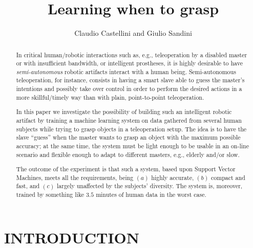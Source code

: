\documentclass{article}
\title{\LARGE \bf Learning when to grasp}
\author{Claudio Castellini and Giulio Sandini}
\begin{document}
\maketitle

\begin{abstract}

In critical human/robotic interactions such as, e.g., teleoperation by
a disabled master or with insufficient bandwidth, or intelligent
prostheses, it is highly desirable to have \emph{semi-autonomous}
robotic artifacts interact with a human being. Semi-autonomous
teleoperation, for instance, consists in having a smart slave able to
guess the master's intentions and possibly take over control in order
to perform the desired actions in a more skillful/timely way than with
plain, point-to-point teleoperation.

In this paper we investigate the possibility of building such an
intelligent robotic artifact by training a machine learning system on
data gathered from several human subjects while trying to grasp objects
in a teleoperation setup. The idea is to have the slave ``guess'' when
the master wants to grasp an object with the maximum possible
accuracy; at the same time, the system must be light enough to be
usable in an on-line scenario and flexible enough to adapt to
different masters, e.g., elderly and/or slow.

The outcome of the experiment is that such a system, based upon
Support Vector Machines, meets all the requirements, being $(a)$
highly accurate, $(b)$ compact and fast, and $(c)$ largely unaffected
by the subjects' diversity. The system is, moreover, trained by
something like $3.5$ minutes of human data in the worst case.

\end{abstract}

\section{INTRODUCTION}
\end{document}
